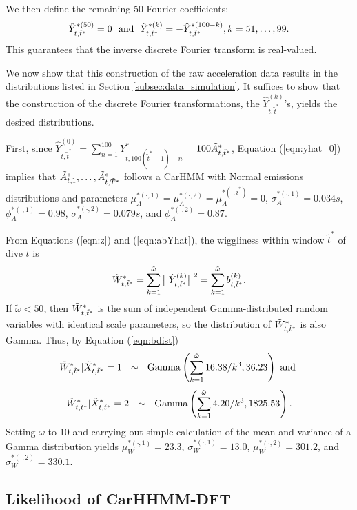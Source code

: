    We then define the remaining 50 Fourier coefficients:
    \[
    \hat{Y}^{*(50)}_{t,\tilde t^*} = 0 {\rm{~~and ~~}}
	\hat{Y}^{*(k)}_{t,\tilde t^*} = -\hat{Y}^{*(100-k)}_{t,\tilde t^*} , k = 51,\ldots,99.
\]
   This guarantees that the inverse discrete Fourier transform is real-valued. 
  

We now show that this construction of the raw acceleration data results in the distributions listed in Section \ref{subsec:data_simulation}. It suffices to show that the construction of the discrete Fourier transformations, the $\hat{Y}^{(k)}_{t,\tilde t^*}$'s, yields the desired distributions.

First, since $\hat{Y}^{(0)}_{t,\tilde t^*} = \sum_{n=1}^{100} Y^*_{t,100(\tilde t^* - 1) + n} $ $=100\tilde{A}^*_{t,\tilde{t}^*}$, Equation (\ref{eqn:yhat_0}) implies that 
$\tilde{A}^*_{t,1}, \ldots, \tilde{A}^*_{t,\tilde{T}^*}$ 
follows a CarHMM with Normal emissions distributions and parameters 
 $\mu_A^{*(\cdot,1)} = \mu_A^{*(\cdot,2)} = \mu_A^{*(\cdot,i^*)} = 0$,  $\sigma_A^{*(\cdot,1)} = 0.034s$, $\phi_A^{*(\cdot,1)} = 0.98$, $\sigma_A^{*(\cdot,2)} = 0.079s$, and $\phi_A^{*(\cdot,2)} = 0.87$.

 From Equations (\ref{eqn:z}) and (\ref{eqn:abYhat}), 
 the wiggliness within window $\tilde t^*$ of dive $t$ is 
\[
    \tilde{W}^*_{t,\tilde t^*} = \sum_{k=1}^{\tilde \omega} \big|\big|\hat{Y}^{(k)}_{t,\tilde t^*}\big|\big|^2 =  \sum_{k=1}^{\tilde \omega} b^{(k)}_{t,\tilde t^*}.
\]
%
If $\tilde \omega < 50$, then $\tilde{W}^*_{t,\tilde t^*}$ is the sum of independent Gamma-distributed random variables with identical scale parameters, so the distribution of $\tilde{W}^*_{t,\tilde t^*}$ is also Gamma. Thus, by Equation (\ref{eqn:bdist})
%
\[
\tilde{W}^*_{t,\tilde t^*}|\tilde X^*_{t,\tilde t^*} = 1  ~~ \sim ~~ {\rm{Gamma}}\left(\sum_{k=1}^{\tilde \omega} 16.38/k^3 , 36.23 \right) 
\text { and }
\]
\[
\tilde{W}^*_{t,\tilde t^*}|\tilde X^*_{t,\tilde t^*} = 2 ~~\sim~~ {\rm{Gamma}}\left(\sum_{k=1}^{\tilde \omega} 4.20/k^3 , 1825.53 \right).
\]
Setting $\tilde \omega$ to 10 and carrying out simple calculation of the mean and variance of a Gamma distribution yields $\mu_W^{*(\cdot,1)} = 23.3$, $\sigma_W^{*(\cdot,1)} = 13.0$, $\mu_W^{*(\cdot,2)} = 301.2$, and $\sigma_W^{*(\cdot,2)} = 330.1$.


\subsection{Likelihood of CarHHMM-DFT}

